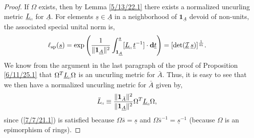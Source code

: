 \documentclass{amsart}
\theoremstyle{definition}
\numberwithin{theorem}{section}
\numberwithin{equation}{section}
\begin{document}
  \begin{proof}  
  If $\Omega$ exists, then by Lemma \ref{5/13/22.1} there exists a normalized uncurling metric $\underline{L}_{\shortparallel}$ for $\underline{A}$.  For elements $\underline{s}\in \underline{A}$ in a neighborhood of $\mathbf{1}_{\underline{A}}$ devoid of non-units, the associated special unital norm is, \begin{equation}\label{1/9/25.1} \ell_{\rm sp}(\underline{s}) =    \exp\left(\frac{1}{\|\mathbf{1}_{\underline{A}}\|^2}\int_{\mathbf{1}_{\underline{A}}}^{\underline{s}} [\underline{L}_{\shortparallel}\,\underline{t}^{-1}]\cdot \mathbf{d}\underline{t}\right) = [\text{det}(\underline{\mathcal{I}}\, \underline{s})]^\frac{1}{m}.\end{equation}
  We know from the argument in the last paragraph of the proof of Proposition \ref{6/11/25.1} that $\Omega^T \underline{L}_{\shortparallel} \Omega$ is an uncurling metric for $\bar{A}$.  Thus, it is easy to see that we then have a normalized uncurling metric for $\bar{A}$ given by, 
  \begin{equation}\label{1/9/25.2} \bar{L}_{\shortparallel} \equiv \frac{\|\mathbf{1}_{\bar{A}}\|^2}{\|\mathbf{1}_{\underline{A}}\|^2} \Omega^T \underline{L}_{\shortparallel} \Omega, \end{equation} since (\ref{7/7/21.1}) is satisfied because $\Omega\bar{s} =  \underline{s}$ and  $\Omega\bar{s}^{-1} =  \underline{s}^{-1}$ (because $\Omega$ is an epimorphism of rings).
  


\end{proof}
\end{document}
